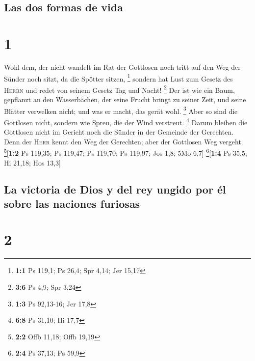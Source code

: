 \hypertarget{las-dos-formas-de-vida}{%
\subsection{Las dos formas de vida}\label{las-dos-formas-de-vida}}

\hypertarget{section}{%
\section{1}\label{section}}

 Wohl dem, der nicht wandelt im Rat der Gottlosen noch
tritt auf den Weg der Sünder noch sitzt, da die Spötter sitzen,
\footnote{\textbf{1:1} Ps 119,1; Ps 26,4; Spr 4,14; Jer 15,17}
 sondern hat Lust zum Gesetz des \textsc{Herrn} und redet
von seinem Gesetz Tag und Nacht! \footnote{\textbf{3:6} Ps 4,9; Spr 3,24}
 Der ist wie ein Baum, gepflanzt an den Wasserbächen, der
seine Frucht bringt zu seiner Zeit, und seine Blätter verwelken nicht;
und was er macht, das gerät wohl. \footnote{\textbf{1:3} Ps 92,13-16;
  Jer 17,8}  Aber so sind die Gottlosen nicht, sondern wie
Spreu, die der Wind verstreut. \footnote{\textbf{6:8} Ps 31,10; Hi 17,7}
 Darum bleiben die Gottlosen nicht im Gericht noch die
Sünder in der Gemeinde der Gerechten.  Denn der
\textsc{Herr} kennt den Weg der Gerechten; aber der Gottlosen Weg
vergeht. \footnote{\textbf{2:2} Offb 11,18; Offb 19,19}{[}\textbf{1:2}
Ps 119,35; Ps 119,47; Ps 119,70; Ps 119,97; Jos 1,8; 5Mo 6,7{]}
\footnote{\textbf{2:4} Ps 37,13; Ps 59,9}{[}\textbf{1:4} Ps 35,5; Hi
21,18; Hos 13,3{]}

\hypertarget{la-victoria-de-dios-y-del-rey-ungido-por-uxe9l-sobre-las-naciones-furiosas}{%
\subsection{La victoria de Dios y del rey ungido por él sobre las
naciones
furiosas}\label{la-victoria-de-dios-y-del-rey-ungido-por-uxe9l-sobre-las-naciones-furiosas}}

\hypertarget{section-1}{%
\section{2}\label{section-1}}

